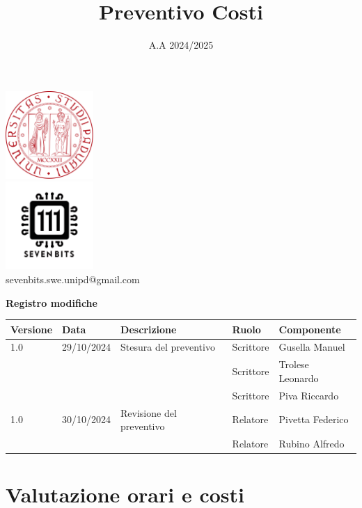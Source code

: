 \documentclass[10pt]{article}
\title{Preventivo Costi}
\date{A.A 2024/2025}
\begin{document}
\maketitle
\begin{center}
\includegraphics[width=0.25\textwidth]{LogoUnipd}\\
\includegraphics[width=0.25\textwidth]{Sevenbitslogo}\\
sevenbits.swe.unipd@gmail.com\\
\vspace{2mm}

\textbf{Registro modifiche}\\
\vspace{2mm}
\begin{tabular}{|l|l|l|l|l|}
\hline
\textbf{Versione} & \textbf{Data} & \textbf{Descrizione} & \textbf{Ruolo} & \textbf{Componente} \\
\hline
1.0 & 29/10/2024 & Stesura del preventivo & Scrittore & Gusella Manuel\\
& & & Scrittore & Trolese Leonardo\\
& & & Scrittore & Piva Riccardo\\
\hline
1.0 & 30/10/2024 & Revisione del preventivo & Relatore & Pivetta Federico\\
& & & Relatore & Rubino Alfredo\\
\hline
\end{tabular}
\end{center}
\newpage
\tableofcontents
\newpage
\section{Valutazione orari e costi}
\end{document}
